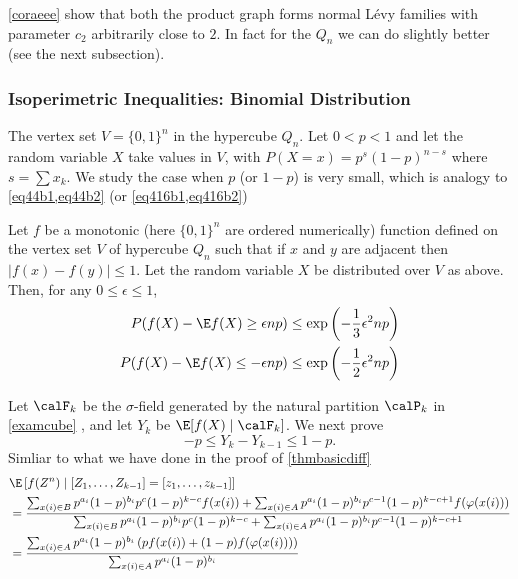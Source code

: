 \documentclass{article}
\begin{document}
\begin{rema}
\cref{coraeee} show that both the  product graph  forms normal L\'{e}vy families with parameter $c_{2}$ arbitrarily close to $2$. In fact for the $Q_{n}$ we can do slightly better (see the next subsection).
\end{rema}

\subsubsection{Isoperimetric Inequalities: Binomial Distribution}\label{sssec:bio}
The vertex set $V =\{0,1\}^{ n }$ in the hypercube $Q_{n}$. Let $0<p<1$ and let the random variable $X$ take values in $V$, with $P ( X = x )= p ^{ s }(1- p )^{ n - s }$ where $s = \sum x _{ k }$. We study the case when $p$ (or $1-p$) is very small, which is analogy to \cref{eq44b1,eq44b2} (or \cref{eq416b1,eq416b2})
\begin{cora}\label{corabiodis}
 Let $f$ be a monotonic (here $\{0,1\}^{ n }$ are ordered numerically) function defined on the vertex set $V$ of hypercube $Q _{ n }$ such that if $x$ and $y$ are adjacent then $| f ( x )- f ( y )| \leq 1$. Let the
random variable $X$ be distributed over $V$ as above. Then, for any $0 \leq \epsilon \leq 1$,
\begin{align}
  P ( f ( X )- \E f ( X ) \geq \epsilon n p) &\leq \exp \left(-\frac{1}{3} \epsilon^{2} np \right) \\
P ( f ( X )- \E f ( X ) \leq-\epsilon n p ) &\leq \exp \left(-\frac{1}{2} \epsilon^{2} np \right) 
\end{align}

\end{cora}
Let $\calF_{ k }$ be the  $\sigma$-field generated by the natural partition $\calP_k$ in \cref{examcube} , and let $Y_{k}$ be $\E[f(X) \mid \calF_k ]$. We next prove
$$
- p \leq Y _{ k }- Y _{ k -1} \leq 1- p.
$$
Simliar to what we have done in the proof of \cref{thmbasicdiff}
\begin{align*}
    &\E \left[ f (Z^n) \mid [Z _{1}, \ldots, Z _{ k -1}]=[z _{1}, \ldots, z_{ k -1}]\right]\\
    & =\frac{\sum_{x(i)\in B} p^{a_i}(1-p)^{b_i}p^c(1-p)^{k-c}f(x(i))+\sum_{x(i)\in A} p^{a_i}(1-p)^{b_i}p^{c-1}(1-p)^{k-c+1}f(\varphi(x(i)))}{\sum_{x(i)\in B} p^{a_i}(1-p)^{b_i}p^c(1-p)^{k-c}+\sum_{x(i)\in A} p^{a_i}(1-p)^{b_i}p^{c-1}(1-p)^{k-c+1}} \\
    & = \frac{\sum_{x(i)\in A} p^{a_i}(1-p)^{b_i}\left(pf(x(i))+(1-p)f(\varphi(x(i)))\right)}{\sum_{x(i)\in A} p^{a_i}(1-p)^{b_i}}
\end{align*}
\end{document}

